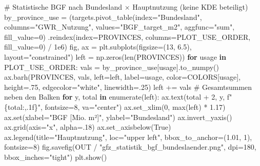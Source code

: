 \documentclass[
  ngerman,
  a4paper,
  DIV=11]{scrreprt}
\newenvironment{Shaded}{\begin{snugshade}}{\end{snugshade}}
\newcommand{\BuiltInTok}[1]{\textcolor[rgb]{0.00,0.23,0.31}{#1}}
\newcommand{\CommentTok}[1]{\textcolor[rgb]{0.37,0.37,0.37}{#1}}
\newcommand{\ControlFlowTok}[1]{\textcolor[rgb]{0.00,0.23,0.31}{\textbf{#1}}}
\newcommand{\DecValTok}[1]{\textcolor[rgb]{0.68,0.00,0.00}{#1}}
\newcommand{\FloatTok}[1]{\textcolor[rgb]{0.68,0.00,0.00}{#1}}
\newcommand{\KeywordTok}[1]{\textcolor[rgb]{0.00,0.23,0.31}{\textbf{#1}}}
\newcommand{\NormalTok}[1]{\textcolor[rgb]{0.00,0.23,0.31}{#1}}
\newcommand{\OperatorTok}[1]{\textcolor[rgb]{0.37,0.37,0.37}{#1}}
\newcommand{\SpecialCharTok}[1]{\textcolor[rgb]{0.37,0.37,0.37}{#1}}
\newcommand{\SpecialStringTok}[1]{\textcolor[rgb]{0.13,0.47,0.30}{#1}}
\newcommand{\StringTok}[1]{\textcolor[rgb]{0.13,0.47,0.30}{#1}}
\newcommand{\VariableTok}[1]{\textcolor[rgb]{0.07,0.07,0.07}{#1}}
\begin{document}
\begin{Shaded}
\begin{Highlighting}[]
\CommentTok{\# Statistische BGF nach Bundesland × Hauptnutzung (keine KDE beteiligt)}
\NormalTok{by\_province\_use }\OperatorTok{=}\NormalTok{ (targets.pivot\_table(index}\OperatorTok{=}\StringTok{"Bundesland"}\NormalTok{, columns}\OperatorTok{=}\StringTok{"GWR\_Nutzung"}\NormalTok{,}
\NormalTok{                values}\OperatorTok{=}\StringTok{"BGF\_target\_m2"}\NormalTok{, aggfunc}\OperatorTok{=}\StringTok{"sum"}\NormalTok{, fill\_value}\OperatorTok{=}\DecValTok{0}\NormalTok{)}
\NormalTok{            .reindex(index}\OperatorTok{=}\NormalTok{PROVINCES, columns}\OperatorTok{=}\NormalTok{PLOT\_USE\_ORDER, fill\_value}\OperatorTok{=}\DecValTok{0}\NormalTok{) }\OperatorTok{/} \FloatTok{1e6}\NormalTok{)}
\NormalTok{fig, ax }\OperatorTok{=}\NormalTok{ plt.subplots(figsize}\OperatorTok{=}\NormalTok{(}\DecValTok{13}\NormalTok{, }\FloatTok{6.5}\NormalTok{), layout}\OperatorTok{=}\StringTok{"constrained"}\NormalTok{)}
\NormalTok{left }\OperatorTok{=}\NormalTok{ np.zeros(}\BuiltInTok{len}\NormalTok{(PROVINCES))}
\ControlFlowTok{for}\NormalTok{ usage }\KeywordTok{in}\NormalTok{ PLOT\_USE\_ORDER:}
\NormalTok{    vals }\OperatorTok{=}\NormalTok{ by\_province\_use[usage].to\_numpy()}
\NormalTok{    ax.barh(PROVINCES, vals, left}\OperatorTok{=}\NormalTok{left, label}\OperatorTok{=}\NormalTok{usage, color}\OperatorTok{=}\NormalTok{COLORS[usage],}
\NormalTok{            height}\OperatorTok{=}\FloatTok{.75}\NormalTok{, edgecolor}\OperatorTok{=}\StringTok{"white"}\NormalTok{, linewidth}\OperatorTok{=}\FloatTok{.25}\NormalTok{)}
\NormalTok{    left }\OperatorTok{+=}\NormalTok{ vals}
\CommentTok{\# Gesamtsummen neben den Balken}
\ControlFlowTok{for}\NormalTok{ y, total }\KeywordTok{in} \BuiltInTok{enumerate}\NormalTok{(left):}
\NormalTok{    ax.text(total }\OperatorTok{+} \DecValTok{2}\NormalTok{, y, }\SpecialStringTok{f"}\SpecialCharTok{\{}\NormalTok{total}\SpecialCharTok{:,.1f\}}\SpecialStringTok{"}\NormalTok{, fontsize}\OperatorTok{=}\DecValTok{8}\NormalTok{, va}\OperatorTok{=}\StringTok{"center"}\NormalTok{)}
\NormalTok{ax.set\_xlim(}\DecValTok{0}\NormalTok{, }\BuiltInTok{max}\NormalTok{(left) }\OperatorTok{*} \FloatTok{1.17}\NormalTok{)}
\NormalTok{ax.}\BuiltInTok{set}\NormalTok{(xlabel}\OperatorTok{=}\StringTok{"BGF [Mio. m²]"}\NormalTok{, ylabel}\OperatorTok{=}\StringTok{"Bundesland"}\NormalTok{)}
\NormalTok{ax.invert\_yaxis()}
\NormalTok{ax.grid(axis}\OperatorTok{=}\StringTok{"x"}\NormalTok{, alpha}\OperatorTok{=}\FloatTok{.18}\NormalTok{)}
\NormalTok{ax.set\_axisbelow(}\VariableTok{True}\NormalTok{)}
\NormalTok{ax.legend(title}\OperatorTok{=}\StringTok{"Hauptnutzung"}\NormalTok{, loc}\OperatorTok{=}\StringTok{"upper left"}\NormalTok{, bbox\_to\_anchor}\OperatorTok{=}\NormalTok{(}\FloatTok{1.01}\NormalTok{, }\DecValTok{1}\NormalTok{), fontsize}\OperatorTok{=}\DecValTok{8}\NormalTok{)}
\NormalTok{fig.savefig(OUT }\OperatorTok{/} \StringTok{"gfz\_statistik\_bgf\_bundeslaender.png"}\NormalTok{, dpi}\OperatorTok{=}\DecValTok{180}\NormalTok{, bbox\_inches}\OperatorTok{=}\StringTok{"tight"}\NormalTok{)}
\NormalTok{plt.show()}
\end{Highlighting}
\end{Shaded}
\end{document}
